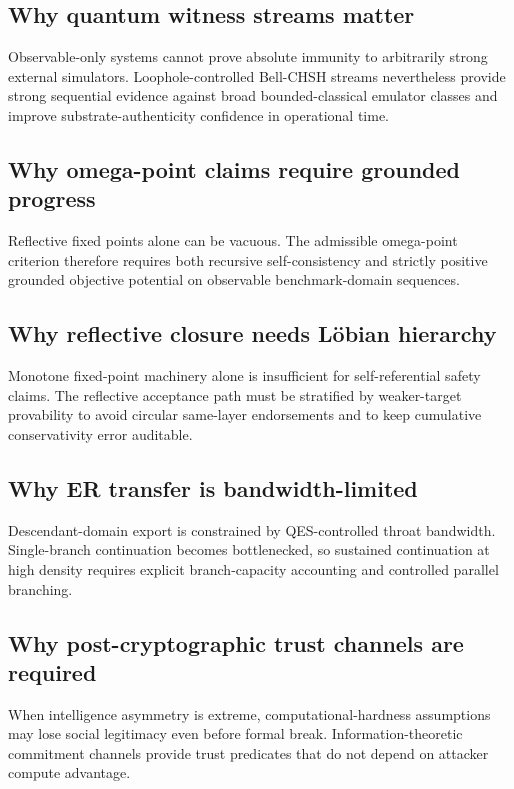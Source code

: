 \documentclass[11pt,a4paper]{article}
\theoremstyle{definition}
\theoremstyle{remark}
\begin{document}
\subsection{Why quantum witness streams matter}
Observable-only systems cannot prove absolute immunity to arbitrarily strong external simulators.
Loophole-controlled Bell-CHSH streams nevertheless provide strong sequential evidence against broad bounded-classical emulator classes and improve substrate-authenticity confidence in operational time.

\subsection{Why omega-point claims require grounded progress}
Reflective fixed points alone can be vacuous.
The admissible omega-point criterion therefore requires both recursive self-consistency and strictly positive grounded objective potential on observable benchmark-domain sequences.

\subsection{Why reflective closure needs L\"obian hierarchy}
Monotone fixed-point machinery alone is insufficient for self-referential safety claims.
The reflective acceptance path must be stratified by weaker-target provability to avoid circular same-layer endorsements and to keep cumulative conservativity error auditable.

\subsection{Why ER transfer is bandwidth-limited}
Descendant-domain export is constrained by QES-controlled throat bandwidth.
Single-branch continuation becomes bottlenecked, so sustained continuation at high density requires explicit branch-capacity accounting and controlled parallel branching.

\subsection{Why post-cryptographic trust channels are required}
When intelligence asymmetry is extreme, computational-hardness assumptions may lose social legitimacy even before formal break.
Information-theoretic commitment channels provide trust predicates that do not depend on attacker compute advantage.
\end{document}
